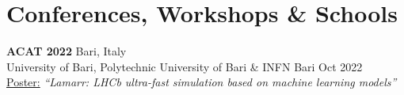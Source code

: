 \newcommand{\event}[2]
  {\normalsize \textbf{\color{hlcolor-0} #1} \hfill {\color{hlcolor-2} #2}}
  
\newcommand{\organizer}[2]
  {\small \color{hlcolor-1} {#1} \hfill {#2}}
  
\newcommand{\contribution}[3][]
  {\normalsize \color{maincolor} \ul{#2:} \emph{``#3''} {#1}}
  
\newcommand{\theme}[1]
  {\normalsize \color{maincolor} \ul{Theme:} \emph{#1}}
  
\newcommand{\button}[2]
  {\large \color{maincolor} \href{#1}{#2}}
  

\section*{Conferences, Workshops \& Schools}
\begin{cvcontent}
  \event{ACAT 2022}{Bari, Italy}\\
  \organizer{University of Bari, Polytechnic University of Bari \& INFN Bari}{Oct 2022}\\
  \contribution{Poster}{Lamarr: LHCb ultra-fast simulation based on machine learning models} \hfill
  \button{https://indico.cern.ch/event/1106990/contributions/4991348/attachments/2529001/4363319/lamarr_poster_acat2022.pdf}{\faFilePdf[regular]}
  \button{https://mbarbetti.github.io/poster-acat2022-lamarr/poster.html}{\faLink}
  \button{https://indico.cern.ch/event/1106990/contributions/4991348}{\faGlobe}

\end{cvcontent}
